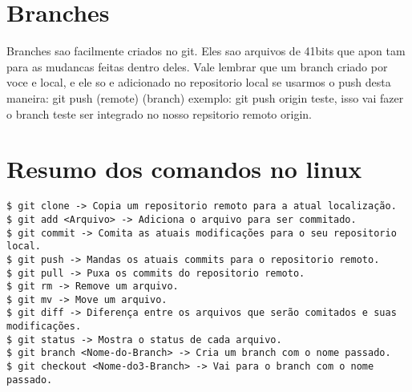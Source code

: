 \documentclass{article}
\begin{document}
\section{Branches}
    Branches sao facilmente criados no git. Eles sao arquivos de 41bits que apon
tam para as mudancas feitas dentro deles. Vale lembrar que um branch criado por
voce e local, e ele so e adicionado no repositorio local se usarmos o push desta
maneira:
    git push (remote) (branch)
exemplo: git push origin teste, isso vai fazer o branch teste ser integrado
no nosso repsitorio remoto origin.

\section{Resumo dos comandos no linux}
\begin{tabbing}
\hspace{0.5cm}  \=  \verb#$ git clone -> Copia um repositorio remoto para a atual localização.#\\
                \>  \verb#$ git add <Arquivo> -> Adiciona o arquivo para ser commitado.#\\
                \>  \verb#$ git commit -> Comita as atuais modificações para o seu repositorio local.#\\
                \>  \verb#$ git push -> Mandas os atuais commits para o repositorio remoto.#\\
                \>  \verb#$ git pull -> Puxa os commits do repositorio remoto.#\\
                \>  \verb#$ git rm -> Remove um arquivo.#\\
                \>  \verb#$ git mv -> Move um arquivo.#\\
                \>  \verb#$ git diff -> Diferença entre os arquivos que serão comitados e suas modificações.#\\
                \>  \verb#$ git status -> Mostra o status de cada arquivo.#\\
                \>  \verb#$ git branch <Nome-do-Branch> -> Cria um branch com o nome passado.#\\
                \>  \verb#$ git checkout <Nome-do3-Branch> -> Vai para o branch com o nome passado.#\\
\end{tabbing}
\end{document}
